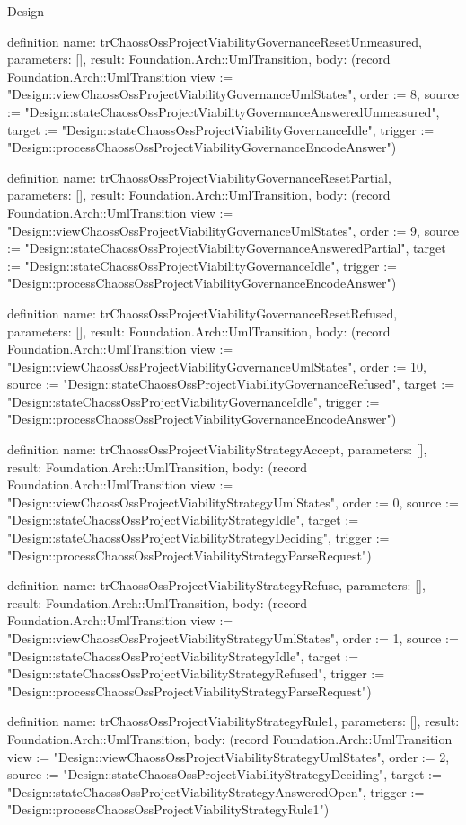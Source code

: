 \begin{lexlean}{Design}
\begin{semanticmodule}
definition{
  name: trChaossOssProjectViabilityGovernanceResetUnmeasured,
  parameters: [],
  result: Foundation.Arch::UmlTransition,
  body: (record Foundation.Arch::UmlTransition {view := "Design::viewChaossOssProjectViabilityGovernanceUmlStates", order := 8, source := "Design::stateChaossOssProjectViabilityGovernanceAnsweredUnmeasured", target := "Design::stateChaossOssProjectViabilityGovernanceIdle", trigger := "Design::processChaossOssProjectViabilityGovernanceEncodeAnswer"})
}

definition{
  name: trChaossOssProjectViabilityGovernanceResetPartial,
  parameters: [],
  result: Foundation.Arch::UmlTransition,
  body: (record Foundation.Arch::UmlTransition {view := "Design::viewChaossOssProjectViabilityGovernanceUmlStates", order := 9, source := "Design::stateChaossOssProjectViabilityGovernanceAnsweredPartial", target := "Design::stateChaossOssProjectViabilityGovernanceIdle", trigger := "Design::processChaossOssProjectViabilityGovernanceEncodeAnswer"})
}

definition{
  name: trChaossOssProjectViabilityGovernanceResetRefused,
  parameters: [],
  result: Foundation.Arch::UmlTransition,
  body: (record Foundation.Arch::UmlTransition {view := "Design::viewChaossOssProjectViabilityGovernanceUmlStates", order := 10, source := "Design::stateChaossOssProjectViabilityGovernanceRefused", target := "Design::stateChaossOssProjectViabilityGovernanceIdle", trigger := "Design::processChaossOssProjectViabilityGovernanceEncodeAnswer"})
}

definition{
  name: trChaossOssProjectViabilityStrategyAccept,
  parameters: [],
  result: Foundation.Arch::UmlTransition,
  body: (record Foundation.Arch::UmlTransition {view := "Design::viewChaossOssProjectViabilityStrategyUmlStates", order := 0, source := "Design::stateChaossOssProjectViabilityStrategyIdle", target := "Design::stateChaossOssProjectViabilityStrategyDeciding", trigger := "Design::processChaossOssProjectViabilityStrategyParseRequest"})
}

definition{
  name: trChaossOssProjectViabilityStrategyRefuse,
  parameters: [],
  result: Foundation.Arch::UmlTransition,
  body: (record Foundation.Arch::UmlTransition {view := "Design::viewChaossOssProjectViabilityStrategyUmlStates", order := 1, source := "Design::stateChaossOssProjectViabilityStrategyIdle", target := "Design::stateChaossOssProjectViabilityStrategyRefused", trigger := "Design::processChaossOssProjectViabilityStrategyParseRequest"})
}

definition{
  name: trChaossOssProjectViabilityStrategyRule1,
  parameters: [],
  result: Foundation.Arch::UmlTransition,
  body: (record Foundation.Arch::UmlTransition {view := "Design::viewChaossOssProjectViabilityStrategyUmlStates", order := 2, source := "Design::stateChaossOssProjectViabilityStrategyDeciding", target := "Design::stateChaossOssProjectViabilityStrategyAnsweredOpen", trigger := "Design::processChaossOssProjectViabilityStrategyRule1"})
}


\end{semanticmodule}
\end{lexlean}
